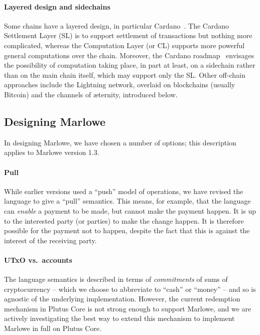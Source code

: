 \documentclass[runningheads]{llncs}
\begin{document}
{\paragraph{Layered design and sidechains}

Some chains have a layered design, in particular Cardano~\cite{cardano}. The Cardano Settlement Layer (SL) is to 
support settlement of transactions but nothing more complicated, whereas the Computation Layer (or CL) supports more 
powerful general computations over the chain. Moreover, the Cardano roadmap~\cite{cardano-rationale} envisages the 
possibility of computation taking place, in part at least, on a sidechain rather than on the main chain itself, which 
may support only the SL. Other off-chain approaches include the Lightning network, overlaid on blockchains (usually 
Bitcoin) and the channels of \ae{}ternity, introduced below.

\subsection{Designing Marlowe}

In designing Marlowe, we have chosen a number of options; this description applies to Marlowe version 1.3. 

\paragraph{Pull} 

While earlier versions used a ``push'' model of operations, we have revised the language to give a ``pull'' semantics. 
This means, for example, that the language can \emph{enable} a payment to be made, but cannot make the payment happen. 
It is up to the interested party (or parties) to make the change happen. It is therefore possible for the payment not to 
happen, despite the fact that this is against the interest of the receiving party.


\paragraph{UTxO vs.\ accounts}

The language semantics is described in terms of \emph{commitments} of sums of cryptocurrency -- which we choose to 
abbreviate to ``cash'' or ``money'' -- and so is agnostic of the underlying implementation.  However, the current 
redemption mechanism in Plutus Core is not strong enough to support Marlowe, and we are actively investigating the best 
way to extend this mechanism to implement Marlowe in full on Plutus Core.

}
\end{document}
